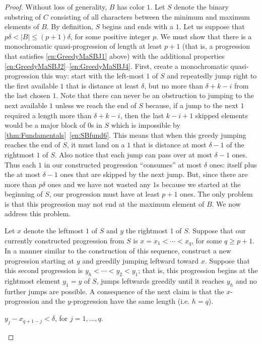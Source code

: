 \begin{proof}
Without loss of generality, $B$ has color $1$. Let $S$ denote the binary substring of $C$ consisting of all characters between the minimum and maximum elements of $B$. By definition, $S$ begins and ends with a $1$. Let us suppose that $p \delta < |B| \leq (p+1)\delta$, for some positive integer $p$. We must show that there is a monochromatic quasi-progression of length at least $p+1$ (that is, a progression that satisfies \ref{en:GreedyMaSBJ1} above) with the additional properties \ref{en:GreedyMaSBJ2}--\ref{en:GreedyMaSBJ4}. First, create a monochromatic quasi-progression this way: start with the left-most $1$ of $S$ and repeatedly jump right to the first available $1$ that is distance at least $\delta$, but no more than $\delta + k-i$ from the last chosen $1$. Note that there can never be an obstruction to jumping to the next available $1$ unless we reach the end of $S$ because, if a jump to the next $1$ required a length more than $\delta + k-i$, then the last $k-i+1$ skipped elements would be a major block of $0$s in $S$ which is impossible by \autoref{thm:Fundamentals}~\ref{en:SBfund6}. This means that when this greedy jumping reaches the end of $S$, it must land on a $1$ that is distance at most $\delta -1$ of the rightmost $1$ of $S$. Also notice that each jump can pass over at most $\delta-1$ ones. Thus each $1$ in our constructed progression ``consumes'' at most $\delta$ ones: itself plus the at most $\delta-1$ ones that are skipped by the next jump. But, since there are more than $p \delta$ ones and we have not wasted any $1$s because we started at the beginning of $S$, our progression must have at least $p+1$ ones. The only problem is that this progression may not end at the maximum element of $B$. We now address this problem.

Let $x$ denote the leftmost $1$ of $S$ and $y$ the rightmost $1$ of $S$. Suppose that our currently constructed progression from $S$ is $x=x_1<\cdots<x_{q}$, for some $q \geq p+1$. In a manner similar to the construction of this sequence, construct a new progression starting at $y$ and greedily jumping leftward toward $x$. Suppose that this second progression is $y_h < \cdots < y_2 < y_1$; that is, this progression begins at the rightmost element $y_1=y$ of $S$, jumps leftwards greedily until it reaches $y_h$ and no further jumps are possible. A consequence of the next claim is that the $x$-progression and the $y$-progression have the same length (i.e. $h=q$).

\begin{claim} $y_j - x_{q+1-j} < \delta$, for $j=1,\ldots,q$.


\end{claim}
\end{proof}
